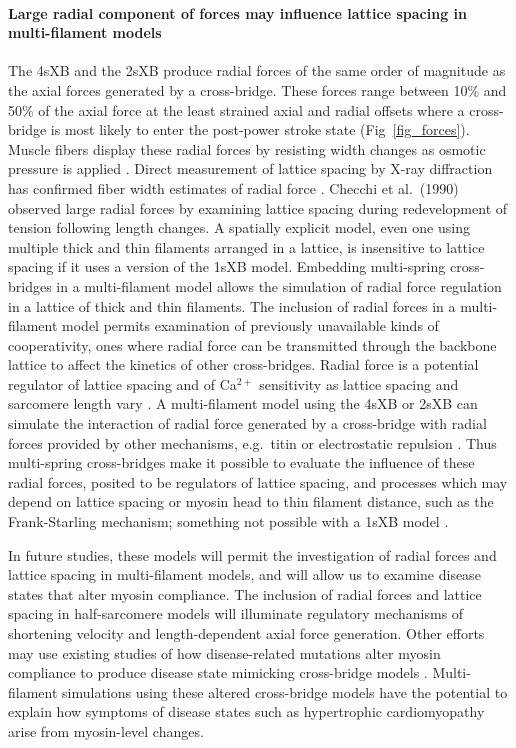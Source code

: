 \documentclass[10pt]{article}
\newcommand{\citep}[1]{\cite{#1}} %
\begin{document}
\paragraph{Large radial component of forces may influence lattice spacing in multi-filament models} %
The 4sXB and the 2sXB produce radial forces of the same order of magnitude as the axial forces generated by a cross-bridge. 
These forces range between 10\% and 50\% of the axial force at the least strained axial and radial offsets where a cross-bridge is most likely to enter the post-power stroke state (Fig~\ref{fig_forces}).
Muscle fibers display these radial forces by resisting width changes as osmotic pressure is applied \citep{Maughan1981}.
Direct measurement of lattice spacing by X-ray diffraction has confirmed fiber width estimates of radial force \citep{Matsubara1984}.
Checchi et al.~(1990) \citep{Cecchi1990} observed large radial forces by examining lattice spacing during redevelopment of tension following length changes. 
A spatially explicit model, even one using multiple thick and thin filaments arranged in a lattice, is insensitive to lattice spacing if it uses a version of the 1sXB model.  
Embedding multi-spring cross-bridges in a multi-filament model allows the simulation of radial force regulation in a lattice of thick and thin filaments.  
The inclusion of radial forces in a multi-filament model permits examination of previously unavailable kinds of cooperativity, ones where radial force can be transmitted through the backbone lattice to affect the kinetics of other cross-bridges. 
Radial force is a potential regulator of lattice spacing and of Ca$^{2+}$ sensitivity as lattice spacing and sarcomere length vary \citep{Millman1998}.  
A multi-filament model using the 4sXB or 2sXB can simulate the interaction of radial force generated by a cross-bridge with radial forces provided by other mechanisms, e.g.\ titin or electrostatic repulsion \citep{Martyn2004, Cazorla2001, Millman1998}. 
Thus multi-spring cross-bridges make it possible to evaluate the influence of these radial forces, posited to be regulators of lattice spacing, and processes which may depend on lattice spacing or myosin head to thin filament distance, such as the Frank-Starling mechanism; something not possible with a 1sXB model \citep{Smith2009}. 

In future studies, these models will permit the investigation of radial forces and lattice spacing in multi-filament models, and will allow us to examine disease states that alter myosin compliance. 
The inclusion of radial forces and lattice spacing in half-sarcomere models will illuminate regulatory mechanisms of shortening velocity and length-dependent axial force generation. 
Other efforts may use existing studies of how disease-related mutations alter myosin compliance to produce disease state mimicking cross-bridge models \citep{Seebohm2009}. 
Multi-filament simulations using these altered cross-bridge models have the potential to explain how symptoms of disease states such as hypertrophic cardiomyopathy arise from myosin-level changes. 
\end{document}
